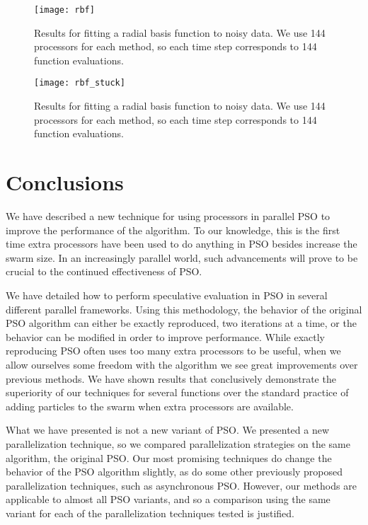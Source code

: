 \documentclass[smallcondensed]{svjour3}
\begin{document}
\begin{figure}
  \centering
  \texttt{[image: rbf]}
  \caption{Results for fitting a radial basis function to noisy data.  We use
  144 processors for each method, so each time step corresponds to 144 function
  evaluations.}
  \label{fig:rbf}
\end{figure}

\begin{figure}
  \centering
  \texttt{[image: rbf\_stuck]}
  \caption{Results for fitting a radial basis function to noisy data.  We use
  144 processors for each method, so each time step corresponds to 144 function
  evaluations.}
  \label{fig:rbf-stuck}
\end{figure}


\section{Conclusions}
\label{sec:conclusion}

We have described a new technique for using processors in parallel PSO to
improve the performance of the algorithm.  To our knowledge, this is the first
time extra processors have been used to do anything in PSO besides increase the
swarm size.  In an increasingly parallel world, such advancements will prove to
be crucial to the continued effectiveness of PSO.

We have detailed how to perform speculative evaluation in PSO in several
different parallel frameworks.  Using this methodology, the behavior of the
original PSO algorithm can either be exactly reproduced, two iterations at a
time, or the behavior can be modified in order to improve performance.  While
exactly reproducing PSO often uses too many extra processors to be useful, when
we allow ourselves some freedom with the algorithm we see great improvements
over previous methods.  We have shown results that conclusively demonstrate the
superiority of our techniques for several functions over the standard practice
of adding particles to the swarm when extra processors are available.

What we have presented is not a new variant of PSO.  We presented a new
parallelization technique, so we compared parallelization strategies on the
same algorithm, the original PSO.  Our most promising techniques do change the
behavior of the PSO algorithm slightly, as do some other previously proposed
parallelization techniques, such as asynchronous PSO.  However, our methods are
applicable to almost all PSO variants, and so a comparison using the same
variant for each of the parallelization techniques tested is justified.
\end{document}
